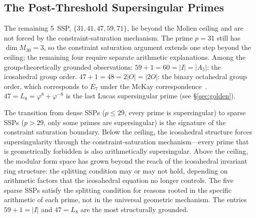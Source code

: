 \documentclass[11pt,letterpaper]{article}
\theoremstyle{definition}
\newcommand{\abs}[1]{\lvert #1 \rvert}
\renewcommand{\phi}{\varphi}
\begin{document}
\subsection{The Post-Threshold Supersingular Primes}
The remaining 5~SSP, $\{31,41,47,59,71\}$, lie beyond the Molien ceiling and are not forced by the constraint-saturation mechanism.  The prime $p=31$ still has $\dim M_{30}=3$, so the constraint saturation argument extends one step beyond the ceiling; the remaining four require separate arithmetic explanations.  Among the group-theoretically grounded observations:
$59+1=60=\abs{I}=\abs{A_5}$: the icosahedral group order.  $47+1=48=2\abs{O}=\abs{2O}$: the binary octahedral group order, which corresponds to $E_7$ under the McKay correspondence~\cite{McKay1980}.  $47 = L_8 = \phi^8+\phi^{-8}$ is the last Lucas supersingular prime (see \S\ref{sec:golden}).
\begin{remarkbox}
The transition from dense SSPs ($p\le 29$, every prime is supersingular) to sparse SSPs ($p>29$, only some primes are supersingular) is the signature of the constraint saturation boundary.  Below the ceiling, the icosahedral structure forces supersingularity through the constraint-saturation mechanism---every prime that is geometrically forbidden is also arithmetically supersingular.  Above the ceiling, the modular form space has grown beyond the reach of the icosahedral invariant ring structure: the splitting condition may or may not hold, depending on arithmetic factors that the icosahedral equation no longer controls.  The five sparse SSPs satisfy the splitting condition for reasons rooted in the specific arithmetic of each prime, not in the universal geometric mechanism.  The entries $59+1=\abs{I}$ and $47=L_8$ are the most structurally grounded.
\end{remarkbox}
\end{document}
